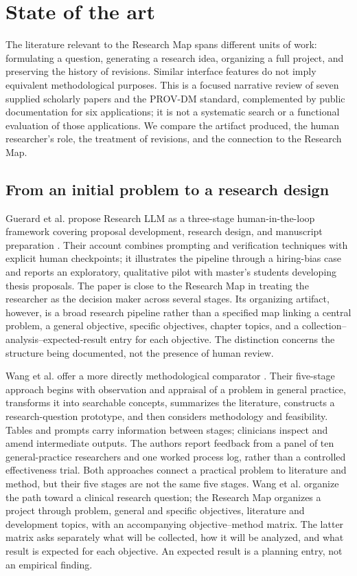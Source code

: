 \section{State of the art}
\label{sec:state-of-the-art}

The literature relevant to the Research Map spans different units of work: formulating a question, generating a research idea, organizing a full project, and preserving the history of revisions. Similar interface features do not imply equivalent methodological purposes. This is a focused narrative review of seven supplied scholarly papers and the PROV-DM standard, complemented by public documentation for six applications; it is not a systematic search or a functional evaluation of those applications. We compare the artifact produced, the human researcher's role, the treatment of revisions, and the connection to the Research Map.

\subsection{From an initial problem to a research design}

Guerard et al. propose Research LLM as a three-stage human-in-the-loop framework covering proposal development, research design, and manuscript preparation \cite{guerard2026researchllm}. Their account combines prompting and verification techniques with explicit human checkpoints; it illustrates the pipeline through a hiring-bias case and reports an exploratory, qualitative pilot with master's students developing thesis proposals. The paper is close to the Research Map in treating the researcher as the decision maker across several stages. Its organizing artifact, however, is a broad research pipeline rather than a specified map linking a central problem, a general objective, specific objectives, chapter topics, and a collection--analysis--expected-result entry for each objective. The distinction concerns the structure being documented, not the presence of human review.

Wang et al. offer a more directly methodological comparator \cite{wang2026fivestage}. Their five-stage approach begins with observation and appraisal of a problem in general practice, transforms it into searchable concepts, summarizes the literature, constructs a research-question prototype, and then considers methodology and feasibility. Tables and prompts carry information between stages; clinicians inspect and amend intermediate outputs. The authors report feedback from a panel of ten general-practice researchers and one worked process log, rather than a controlled effectiveness trial. Both approaches connect a practical problem to literature and method, but their five stages are not the same five stages. Wang et al. organize the path toward a clinical research question; the Research Map organizes a project through problem, general and specific objectives, literature and development topics, with an accompanying objective--method matrix. The latter matrix asks separately what will be collected, how it will be analyzed, and what result is expected for each objective. An expected result is a planning entry, not an empirical finding.

